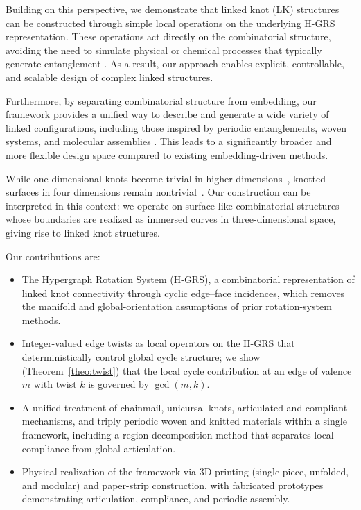 \documentclass[acmtog,anonymous,review]{acmart}
\begin{document}
Building on this perspective, we demonstrate that linked knot (LK) structures can be constructed through simple local operations on the underlying H-GRS representation. These operations act directly on the combinatorial structure, avoiding the need to simulate physical or chemical processes that typically generate entanglement \citep{moestopo2023knots}. As a result, our approach enables explicit, controllable, and scalable design of complex linked structures.

Furthermore, by separating combinatorial structure from embedding, our framework provides a unified way to describe and generate a wide variety of linked configurations, including those inspired by periodic entanglements, woven systems, and molecular assemblies \citep{evans2013periodiceentanglement1,evans2013periodiceentanglement2,yildiz2025woven,yildiz2025linked}. This leads to a significantly broader and more flexible design space compared to existing embedding-driven methods.

While one-dimensional knots become trivial in higher dimensions~\cite{freedman1990topology}, knotted surfaces in four dimensions remain nontrivial~\cite{kamada2002surfaces}. Our construction can be interpreted in this context: we operate on surface-like combinatorial structures whose boundaries are realized as immersed curves in three-dimensional space, giving rise to linked knot structures.

Our contributions are:
\begin{itemize}
      \item The Hypergraph Rotation System (H-GRS), a combinatorial representation of linked knot connectivity through cyclic edge--face incidences, which removes the manifold and global-orientation assumptions of prior rotation-system methods.
      \item Integer-valued edge twists as local operators on the H-GRS that deterministically control global cycle structure; we show (Theorem~\ref{theo:twist}) that the local cycle contribution at an edge of valence $m$ with twist $k$ is governed by $\gcd(m,k)$.
      \item A unified treatment of chainmail, unicursal knots, articulated and compliant mechanisms, and triply periodic woven and knitted materials within a single framework, including a region-decomposition method that separates local compliance from global articulation.
      \item Physical realization of the framework via 3D printing (single-piece, unfolded, and modular) and paper-strip construction, with fabricated prototypes demonstrating articulation, compliance, and periodic assembly.
  \end{itemize}
\end{document}
